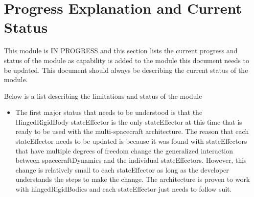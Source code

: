
\section{Progress Explanation and Current Status}

This module is IN PROGRESS and this section lists the current progress and status of the module as capability is added to the module this document needs to be updated. This document should always be describing the current status of the module. 

Below is a list describing the limitations and status of the module

\begin{itemize}
	\item The first major status that needs to be understood is that the HingedRigidBody stateEffector is the only stateEffector at this time that is ready to be used with the multi-spacecraft architecture. The reason that each stateEffector needs to be updated is because it was found with stateEffectors that have multiple degrees of freedom change the generalized interaction between spacecraftDynamics and the individual stateEffectors. However, this change is relatively small to each stateEffector as long as the developer understands the steps to make the change. The architecture is proven to work with hingedRigidBodies and each stateEffector just needs to follow suit. 
	

\end{itemize}

